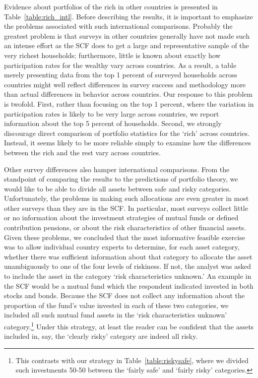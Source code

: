 \documentclass[12pt]{article}
\begin{document}
Evidence about portfolios of the rich in other countries is presented in
Table~\ref{table:rich_intl}. Before describing the results, it is important to emphasize
the problems associated with such international comparisons. Probably the
greatest problem is that surveys in other countries generally have not made
such an intense effort as the SCF does to get a large and representative
sample of the very richest households; furthermore, little is known about
exactly how participation rates for the wealthy vary across countries. As a
result, a table merely presenting data from the top 1 percent of surveyed
households across countries might well reflect differences in survey success
and methodology more than actual differences in behavior across countries.
Our response to this problem is twofold. First, rather than focusing on the
top 1 percent, where the variation in participation rates is likely to be
very large across countries, we report information about the top 5 percent
of households. Second, we strongly discourage direct comparison of portfolio
statistics for the `rich' across countries. Instead, it seems likely to be
more reliable simply to examine how the differences between the rich and the
rest vary across countries.

Other survey differences also hamper international comparisons. From the
standpoint of comparing the results to the predictions of portfolio theory,
we would like to be able to divide all assets between safe and risky
categories. Unfortunately, the problems in making such allocations are even
greater in most other surveys than they are in the SCF. In particular, most
surveys collect little or no information about the investment strategies of
mutual funds or defined contribution pensions, or about the risk
characteristics of other financial assets. Given these problems, we
concluded that the most informative feasible exercise was to allow
individual country experts to determine, for each asset category, whether
there was sufficient information about that category to allocate the asset
unambiguously to one of the four levels of riskiness. If not, the analyst
was asked to include the asset in the category `risk characteristics
unknown.' An example in the SCF would be a mutual fund which the respondent
indicated invested in both stocks and bonds. Because the SCF does not
collect any information about the proportion of the fund's value invested in
each of these two categories, we included all such mutual fund assets in the
`risk characteristics unknown' category.\footnote{%
This contrasts with our strategy in Table~\ref{table:riskysafe}, where we
divided such investments 50-50 between the `fairly safe' and `fairly risky'
categories.} Under this strategy, at least the reader can be confident that
the assets included in, say, the `clearly risky' category are indeed all
risky.
\end{document}
